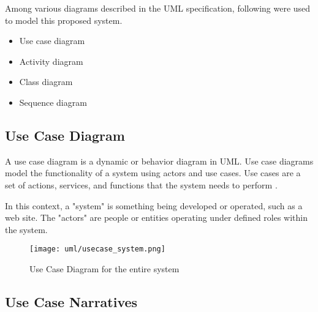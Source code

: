 \documentclass[12pt]{report}
\begin{document}
Among various diagrams described in the UML specification, following were used to model this proposed system.

\begin{itemize}
	\item Use case diagram
	\item Activity diagram
	\item Class diagram
	\item Sequence diagram
\end{itemize}

\newpage
\subsection{Use Case Diagram}
A use case diagram is a dynamic or behavior diagram in UML. Use case diagrams model the functionality of a system using actors and use cases. Use cases are a set of actions, services, and functions that the system needs to perform \cite{paradigm_2018_uml}.

In this context, a "system" is something being developed or operated, such as a web site. The "actors" are people or entities operating under defined roles within the system.

\begin{figure}[H]
	\centering
	\texttt{[image: uml/usecase\_system.png]}
	\caption{Use Case Diagram for the entire system}
\end{figure}

\newpage
\subsection{Use Case Narratives}
\end{document}
